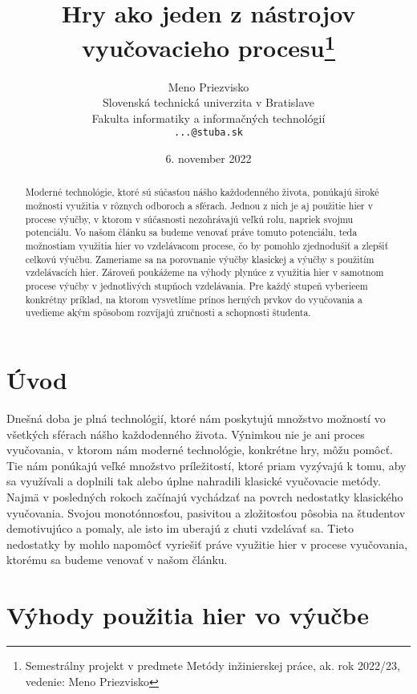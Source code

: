 \documentclass[10pt,twoside,slovak,a4paper]{article}
\title{Hry ako jeden z nástrojov vyučovacieho procesu\thanks{Semestrálny projekt v predmete Metódy inžinierskej práce, ak. rok 2022/23, vedenie: Meno Priezvisko}}
\author{Meno Priezvisko\\[2pt]
	{\small Slovenská technická univerzita v Bratislave}\\
	{\small Fakulta informatiky a informačných technológií}\\
	{\small \texttt{...@stuba.sk}}
	}
\date{\small 6. november 2022}
\begin{document}
\maketitle

\begin{abstract}

Moderné technológie, ktoré sú súčasťou nášho každodenného života, ponúkajú široké možnosti využitia v rôznych odboroch a sférach. Jednou z nich je aj použitie hier v procese výučby, v ktorom v súčasnosti nezohrávajú veľkú rolu, napriek svojmu potenciálu. Vo našom článku sa budeme venovať práve tomuto potenciálu, teda možnostiam využitia hier vo vzdelávacom procese, čo by pomohlo zjednodušiť a zlepšiť celkovú výučbu. Zameriame sa na porovnanie výučby klasickej a výučby s použitím vzdelávacích hier. Zároveň poukážeme na výhody plynúce z využitia hier v samotnom procese výučby v jednotlivých stupňoch vzdelávania. Pre každý stupeň vyberieem konkrétny príklad, na ktorom vysvetlíme prínos herných prvkov do vyučovania a uvedieme akým spôsobom rozvíjajú zručnosti a schopnosti študenta.

\end{abstract}



\section{Úvod}

Dnešná doba je plná technológií, ktoré nám poskytujú množstvo možností vo všetkých sférach nášho každodenného života. Výnimkou nie je ani proces vyučovania, v ktorom nám moderné technológie, konkrétne hry\cite{Zea2009-eh}, môžu pomôcť. Tie nám ponúkajú veľké množstvo príležitostí, ktoré priam vyzývajú k tomu, aby sa využívali a doplnili tak alebo úplne nahradili klasické vyučovacie metódy. Najmä v posledných rokoch začínajú vychádzať na povrch nedostatky klasického vyučovania. Svojou monotónnosťou, pasivitou a zložitosťou pôsobia na študentov demotivujúco a pomaly, ale isto im uberajú z chuti vzdelávať sa. Tieto nedostatky by mohlo napomôcť vyriešiť práve využitie hier v procese vyučovania, ktorému sa budeme venovať v našom článku. 

\section{Výhody použitia hier vo výučbe} \label{vyhody}
\end{document}
